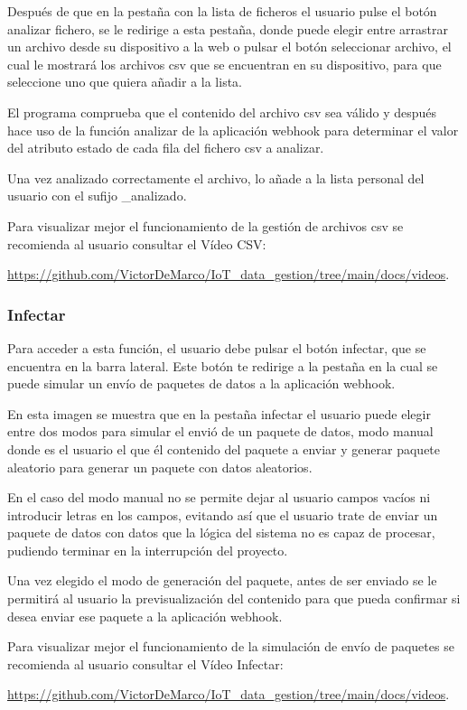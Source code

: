 
Después de que en la pestaña con la lista de ficheros el usuario pulse el botón analizar fichero, se le redirige a esta pestaña, donde puede elegir entre arrastrar un archivo desde su dispositivo a la web o pulsar el botón seleccionar archivo, el cual le mostrará los archivos csv que se encuentran en su dispositivo, para que seleccione uno que quiera añadir a la lista.

El programa comprueba que el contenido del archivo csv sea válido y después hace uso de la función analizar de la aplicación webhook para determinar el valor del atributo estado de cada fila del fichero csv a analizar.

Una vez analizado correctamente el archivo, lo añade a la lista personal del usuario con el sufijo \_analizado.

Para visualizar mejor el funcionamiento de la gestión de archivos csv se recomienda al usuario consultar el Vídeo CSV:

\href{https://github.com/VictorDeMarco/IoT_data_gestion/tree/main/docs/videos}{https://github.com/VictorDeMarco/IoT\_data\_gestion/tree/main/docs/videos}.


\subsubsection{Infectar}
Para acceder a esta función, el usuario debe pulsar el botón infectar, que se encuentra en la barra lateral. Este botón te redirige a la pestaña en la cual se puede simular un envío de paquetes de datos a la aplicación webhook. 


En esta imagen se muestra que en la pestaña infectar el usuario puede elegir entre dos modos para simular el envió de un paquete de datos, modo manual donde es el usuario el que 
él contenido del paquete a enviar y generar paquete aleatorio para generar un paquete con datos aleatorios.

En el caso del modo manual no se permite dejar al usuario campos vacíos ni introducir letras en los campos, evitando así que el usuario trate de enviar un paquete de datos con datos que la lógica del sistema no es capaz de procesar, pudiendo terminar en la interrupción del proyecto.

Una vez elegido el modo de generación del paquete, antes de ser enviado se le permitirá al usuario la previsualización del contenido para que pueda confirmar si desea enviar ese paquete a la aplicación webhook.


Para visualizar mejor el funcionamiento de la simulación de envío de paquetes se recomienda al usuario consultar el Vídeo Infectar:

\href{https://github.com/VictorDeMarco/IoT_data_gestion/tree/main/docs/videos}{https://github.com/VictorDeMarco/IoT\_data\_gestion/tree/main/docs/videos}.